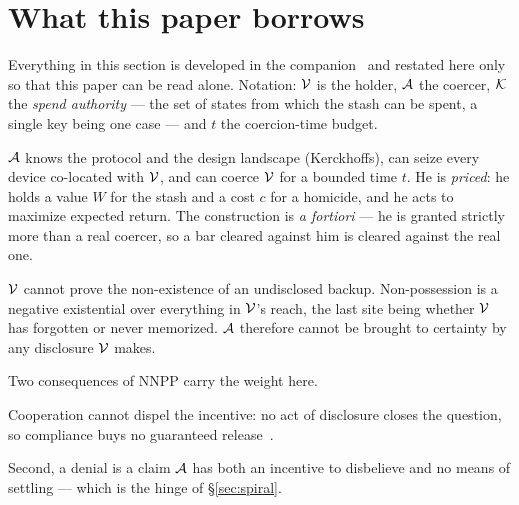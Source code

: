 \section{What this paper borrows}
\label{sec:model}

Everything in this section is developed in the companion~\cite{deadly-race} and
restated here only so that this paper can be read alone. Notation: $\mathcal{V}$ is
the holder, $\mathcal{A}$ the coercer, $\mathcal{K}$ the \emph{spend authority} --- the
set of states from which the stash can be spent, a single key being one case ---
and $t$ the coercion-time budget.

\begin{assumption}\label{ass:power}
$\mathcal{A}$ knows the protocol and the design landscape (Kerckhoffs), can seize
every device co-located with $\mathcal{V}$, and can coerce $\mathcal{V}$ for a bounded
time $t$. He is \emph{priced}: he holds a value $W$ for the stash and a cost $c$
for a homicide, and he acts to maximize expected return. The construction is
\emph{a fortiori} --- he is granted strictly more than a real coercer, so a bar
cleared against him is cleared against the real one.
\end{assumption}

\begin{assumption}\label{lem:nnpl}
$\mathcal{V}$ cannot prove the non-existence of an undisclosed backup. Non-possession
is a negative existential over everything in $\mathcal{V}$'s reach, the last site
being whether $\mathcal{V}$ has forgotten or never memorized. $\mathcal{A}$ therefore
cannot be brought to certainty by any disclosure $\mathcal{V}$ makes.
\end{assumption}

\noindent Two consequences of NNPP carry the weight here.

\begin{corollary}[Disclosure]\label{cor:disclosure}
Cooperation cannot dispel the incentive: no act of disclosure closes the
question, so compliance buys no guaranteed release~\cite[Cor.~1]{deadly-race}.
\end{corollary}

\noindent Second, a denial is a claim $\mathcal{A}$ has both an incentive to
disbelieve and no means of settling --- which is the hinge of
\S\ref{sec:spiral}.

